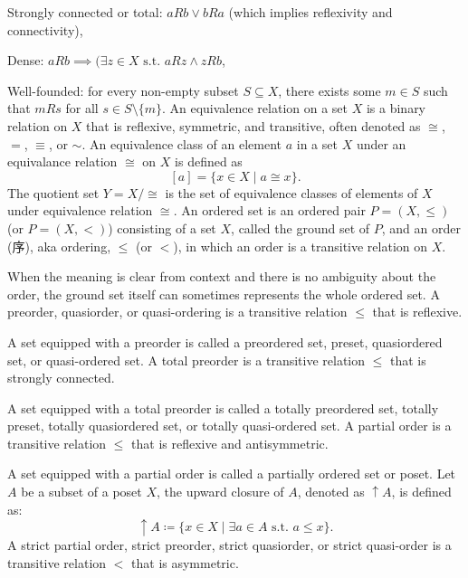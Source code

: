 \documentclass[a4paper,12pt]{article}
\begin{document}
\item Strongly connected or total: $aRb\lor bRa$ (which implies reflexivity and connectivity),
\item Dense: $aRb\implies (\exists z\in X\text{\ s.t.\ }aRz\land zRb$,
\item Well-founded: for every non-empty subset $S\subseteq X$, there exists some $m\in S$ such that $mRs$ for all $s\in S\setminus\{m\}$.
\eit
{}
An equivalence relation on a set $X$ is a binary relation on $X$ that is reflexive, symmetric, and transitive, often denoted as $\cong$, $=$, $\equiv$, or $\sim$.
An equivalence class of an element $a$ in a set $X$ under an equivalance relation $\cong$ on $X$ is defined as
\[[a]=\{x\in X\mid a\cong x\}.\]
The quotient set $Y=X/\cong$ is the set of equivalence classes of elements of $X$ under equivalence relation $\cong$. 
An ordered set is an ordered pair $P=(X,\leq )$ (or $P=(X,<)$) consisting of a set $X$, called the ground set of $P$, and an order (序), aka ordering, $\leq$ (or $<$), in which an order is a transitive relation on $X$.

When the meaning is clear from context and there is no ambiguity about the order, the ground set itself can sometimes represents the whole ordered set.
A preorder, quasiorder, or quasi-ordering is a transitive relation $\leq$ that is reflexive. 

A set equipped with a preorder is called a preordered set, preset, quasiordered set, or quasi-ordered set.
A total preorder is a transitive relation $\leq$ that is strongly connected.

A set equipped with a total preorder is called a totally preordered set, totally preset, totally quasiordered set, or totally quasi-ordered set.
A partial order is a transitive relation $\leq$ that is reflexive and antisymmetric.

A set equipped with a partial order is called a partially ordered set or poset.
Let $A$ be a subset of a poset $X$, the upward closure of $A$, denoted as $\uparrow A$, is defined as:
\[\uparrow A \coloneq \{ x \in X \mid\exists a \in A \text{\ s.t.\ } a \leq x \}.\]
A strict partial order, strict preorder, strict quasiorder, or strict quasi-order is a transitive relation $<$ that is asymmetric.
\end{document}

